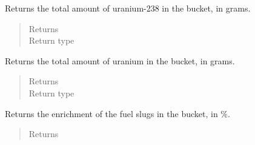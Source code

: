 \documentclass[letterpaper,10pt,openany,oneside,english]{sphinxmanual}
\begin{document}
\begin{fulllineitems}
\begin{fulllineitems}
\end{fulllineitems}


\begin{fulllineitems}
\label{\detokenize{support_rst/fuel_bucket:fuel_bucket.FuelBucket.get_fresh_u238_mass}}
Returns the total amount of uranium-238 in the bucket, in grams.
\begin{quote}\begin{description}
\item[{Returns}] \leavevmode
{}

\item[{Return type}] \leavevmode
{}

\end{description}\end{quote}

\end{fulllineitems}


\begin{fulllineitems}
\label{\detokenize{support_rst/fuel_bucket:fuel_bucket.FuelBucket.get_fresh_u_mass}}
Returns the total amount of uranium in the bucket, in grams.
\begin{quote}\begin{description}
\item[{Returns}] \leavevmode
{}

\item[{Return type}] \leavevmode
{}

\end{description}\end{quote}

\end{fulllineitems}


\begin{fulllineitems}
\label{\detokenize{support_rst/fuel_bucket:fuel_bucket.FuelBucket.get_fuel_enrichment}}
Returns the enrichment of the fuel slugs in the bucket, in \%.
\begin{quote}\begin{description}
\item[{Returns}] \leavevmode
{}


\end{description}
\end{quote}
\end{fulllineitems}
\end{fulllineitems}
\end{document}
